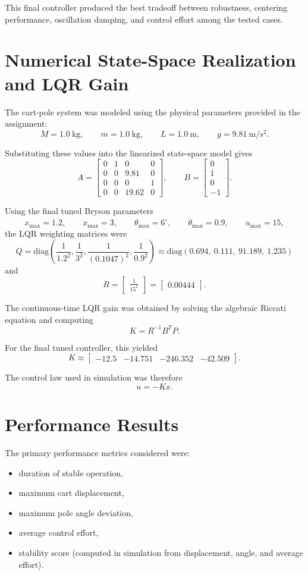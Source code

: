 \documentclass[11pt]{article}
\begin{document}
This final controller produced the best tradeoff between robustness, centering performance, oscillation damping, and control effort among the tested cases.

\newpage
\section{Numerical State-Space Realization and LQR Gain}
The cart-pole system was modeled using the physical parameters provided in the assignment:
\[
M = 1.0~\mathrm{kg}, \qquad
m = 1.0~\mathrm{kg}, \qquad
L = 1.0~\mathrm{m}, \qquad
g = 9.81~\mathrm{m/s^2}.
\]

Substituting these values into the linearized state-space model gives
\[
A =
\begin{bmatrix}
0 & 1 & 0 & 0 \\
0 & 0 & 9.81 & 0 \\
0 & 0 & 0 & 1 \\
0 & 0 & 19.62 & 0
\end{bmatrix},
\qquad
B =
\begin{bmatrix}
0 \\
1 \\
0 \\
-1
\end{bmatrix}.
\]

Using the final tuned Bryson parameters
\[
x_{\max}=1.2,\qquad
\dot{x}_{\max}=3,\qquad
\theta_{\max}=6^\circ,\qquad
\dot{\theta}_{\max}=0.9,\qquad
u_{\max}=15,
\]
the LQR weighting matrices were
\[
Q =
\mathrm{diag}\left(
\frac{1}{1.2^2},
\frac{1}{3^2},
\frac{1}{(0.1047)^2},
\frac{1}{0.9^2}
\right)
\approx
\mathrm{diag}(0.694,\ 0.111,\ 91.189,\ 1.235)
\]
and
\[
R =
\begin{bmatrix}
\frac{1}{15^2}
\end{bmatrix}
=
\begin{bmatrix}
0.00444
\end{bmatrix}.
\]

The continuous-time LQR gain was obtained by solving the algebraic Riccati equation and computing
\[
K = R^{-1}B^TP.
\]

For the final tuned controller, this yielded
\[
K \approx
\begin{bmatrix}
-12.5 & -14.751 & -246.352 & -42.509
\end{bmatrix}.
\]

The control law used in simulation was therefore
\[
u = -Kx.
\]

\newpage
\section{Performance Results}
The primary performance metrics considered were:
\begin{itemize}[itemsep=2pt]
    \item duration of stable operation,
    \item maximum cart displacement,
    \item maximum pole angle deviation,
    \item average control effort,
    \item stability score (computed in simulation from displacement, angle, and average effort).
\end{itemize}
\end{document}
